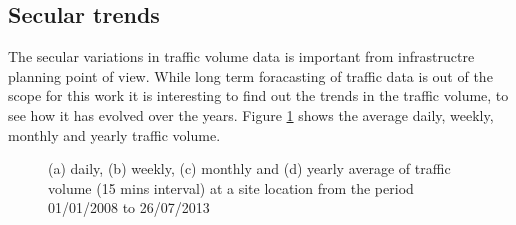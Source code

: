\subsection{Secular trends}
The secular variations in traffic volume data is important from infrastructre planning point of
view. While long term foracasting of traffic data is out of the scope for this work it is interesting
to find out the trends in the traffic volume, to see how it has evolved over the years.
Figure \ref{fig:AverageTrafficVolume} shows the average daily, weekly, monthly and yearly traffic
volume.

\begin{figure}[h]
    \centering
    \qquad

    \qquad

    \caption[Average Traffic Volume]{(a) daily, (b) weekly, (c) monthly and (d) yearly average of
    traffic volume (15 mins interval) at a site location from the period 01/01/2008 to 26/07/2013}
   \label{fig:AverageTrafficVolume}
\end{figure}
